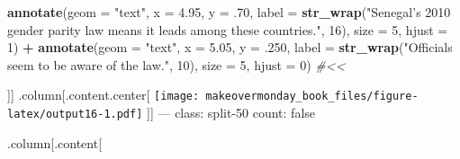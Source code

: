 \documentclass[]{book}
\newenvironment{Shaded}{\begin{snugshade}}{\end{snugshade}}
\newcommand{\KeywordTok}[1]{\textcolor[rgb]{0.13,0.29,0.53}{\textbf{#1}}}
\newcommand{\DataTypeTok}[1]{\textcolor[rgb]{0.13,0.29,0.53}{#1}}
\newcommand{\DecValTok}[1]{\textcolor[rgb]{0.00,0.00,0.81}{#1}}
\newcommand{\FloatTok}[1]{\textcolor[rgb]{0.00,0.00,0.81}{#1}}
\newcommand{\StringTok}[1]{\textcolor[rgb]{0.31,0.60,0.02}{#1}}
\newcommand{\CommentTok}[1]{\textcolor[rgb]{0.56,0.35,0.01}{\textit{#1}}}
\newcommand{\OperatorTok}[1]{\textcolor[rgb]{0.81,0.36,0.00}{\textbf{#1}}}
\newcommand{\NormalTok}[1]{#1}
\theoremstyle{definition}
\theoremstyle{definition}
\theoremstyle{definition}
\theoremstyle{remark}
\begin{document}
\begin{Shaded}
\begin{Highlighting}[]
\StringTok{  }\KeywordTok{annotate}\NormalTok{(}\DataTypeTok{geom =} \StringTok{"text"}\NormalTok{, }\DataTypeTok{x =} \FloatTok{4.95}\NormalTok{, }\DataTypeTok{y =}\NormalTok{ .}\DecValTok{70}\NormalTok{, }\DataTypeTok{label =} \KeywordTok{str_wrap}\NormalTok{(}\StringTok{"Senegal's 2010 gender parity law means it leads among these countries."}\NormalTok{, }\DecValTok{16}\NormalTok{), }\DataTypeTok{size =} \DecValTok{5}\NormalTok{, }\DataTypeTok{hjust =} \DecValTok{1}\NormalTok{) }\OperatorTok{+}
\StringTok{  }\KeywordTok{annotate}\NormalTok{(}\DataTypeTok{geom =} \StringTok{"text"}\NormalTok{, }\DataTypeTok{x =} \FloatTok{5.05}\NormalTok{, }\DataTypeTok{y =}\NormalTok{ .}\DecValTok{250}\NormalTok{, }\DataTypeTok{label =} \KeywordTok{str_wrap}\NormalTok{(}\StringTok{"Officials seem to be aware of the law."}\NormalTok{, }\DecValTok{10}\NormalTok{), }\DataTypeTok{size =} \DecValTok{5}\NormalTok{, }\DataTypeTok{hjust =} \DecValTok{0}\NormalTok{)  }\CommentTok{#<<}
\end{Highlighting}
\end{Shaded}

{]}{]} .column{[}.content.center{[}
\texttt{[image: makeovermonday\_book\_files/figure-latex/output16-1.pdf]}
{]}{]} --- class: split-50 count: false

.column{[}.content{[}
\end{document}
